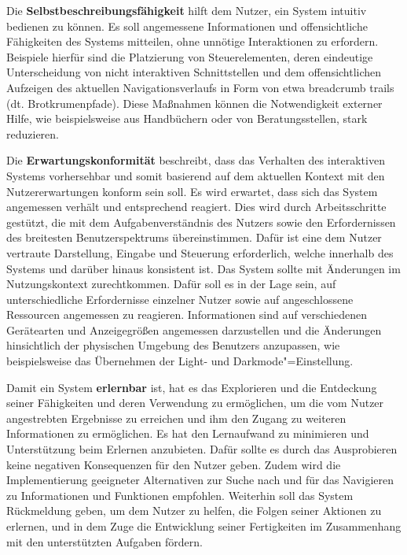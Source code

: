 Die \textbf{Selbstbeschreibungsfähigkeit} hilft dem Nutzer, ein System intuitiv bedienen zu können. Es soll angemessene Informationen und offensichtliche Fähigkeiten des Systems mitteilen, ohne unnötige Interaktionen zu erfordern. Beispiele hierfür sind die Platzierung von Steuerelementen, deren eindeutige Unterscheidung von nicht interaktiven Schnittstellen und dem offensichtlichen Aufzeigen des aktuellen Navigationsverlaufs in Form von etwa breadcrumb trails (dt. Brotkrumenpfade). Diese Maßnahmen können die Notwendigkeit externer Hilfe, wie beispielsweise aus Handbüchern oder von Beratungsstellen, stark reduzieren.

Die \textbf{Erwartungskonformität} beschreibt, dass das Verhalten des interaktiven Systems vorhersehbar und somit basierend auf dem aktuellen Kontext mit den Nutzererwartungen konform sein soll.
Es wird erwartet, dass sich das System angemessen verhält und entsprechend reagiert. Dies wird durch Arbeitsschritte gestützt, die mit dem Aufgabenverständnis des Nutzers sowie den Erfordernissen des breitesten Benutzerspektrums übereinstimmen. Dafür ist eine dem Nutzer vertraute Darstellung, Eingabe und Steuerung erforderlich, welche innerhalb des Systems und darüber hinaus konsistent ist.
Das System sollte mit Änderungen im Nutzungskontext zurechtkommen. Dafür soll es in der Lage sein, auf unterschiedliche Erfordernisse einzelner Nutzer sowie auf angeschlossene Ressourcen angemessen zu reagieren. Informationen sind auf verschiedenen Gerätearten und Anzeigegrößen angemessen darzustellen und die Änderungen hinsichtlich der physischen Umgebung des Benutzers anzupassen, wie beispielsweise das Übernehmen der Light- und Darkmode"=Einstellung.

Damit ein System \textbf{erlernbar} ist, hat es das Explorieren und die Entdeckung seiner Fähigkeiten und deren Verwendung zu ermöglichen, um die vom Nutzer angestrebten Ergebnisse zu erreichen und ihm den Zugang zu weiteren Informationen zu ermöglichen. Es hat den Lernaufwand zu minimieren und Unterstützung beim Erlernen anzubieten. Dafür sollte es durch das Ausprobieren keine negativen Konsequenzen für den Nutzer geben. Zudem wird die Implementierung geeigneter Alternativen zur Suche nach und für das Navigieren zu Informationen und Funktionen empfohlen.
Weiterhin soll das System Rückmeldung geben, um dem Nutzer zu helfen, die Folgen seiner Aktionen zu erlernen, und in dem Zuge die Entwicklung seiner Fertigkeiten im Zusammenhang mit den unterstützten Aufgaben fördern.

